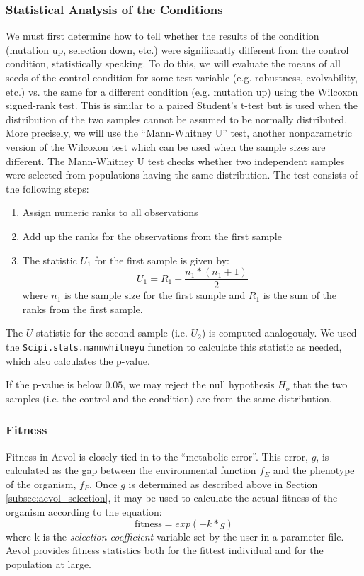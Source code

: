 \subsubsection{Statistical Analysis of the Conditions}
We must first determine how to tell whether the results of the condition (mutation up, selection down, etc.) were significantly different from the control condition, statistically speaking. To do this, we will evaluate the means of all seeds of the control condition for some test variable (e.g. robustness, evolvability, etc.) vs. the same for a different condition (e.g. mutation up) using the Wilcoxon signed-rank test. This is similar to a paired Student's t-test but is used when the distribution of the two samples cannot be assumed to be normally distributed. More precisely, we will use the ``Mann-Whitney U'' test, another nonparametric version of the Wilcoxon test which can be used when the sample sizes are different. The Mann-Whitney U test checks whether two independent samples were selected from populations having the same distribution. The test consists of the following steps:
\begin{enumerate}
	\item Assign numeric ranks to all observations
	\item Add up the ranks for the observations from the first sample
	\item The statistic $U_1$ for the first sample is given by:
	\begin{equation*}
	U_1 = R_1 - \frac{n_1*(n_1 + 1)}{2}
	\end{equation*}
	where $n_1$ is the sample size for the first sample and $R_1$ is the sum of the ranks from the first sample.
\end{enumerate}
The $U$ statistic for the second sample (i.e. $U_2$) is computed analogously. We used the \texttt{Scipi.stats.mannwhitneyu} function to calculate this statistic as needed, which also calculates the p-value. 

If the p-value is below $0.05$, we may reject the null hypothesis $H_o$ that the two samples (i.e. the control and the condition) are from the same distribution.

\subsubsection{Fitness}
Fitness in Aevol is closely tied in to the ``metabolic error''. This error, $g$, is calculated as the gap between the environmental function $f_E$ and the phenotype of the organism, $f_P$. Once $g$ is determined as described above in Section \ref{subsec:aevol_selection}, it may be used to calculate the actual fitness of the organism according to the equation:
\begin{equation*}
\text{fitness} = exp(-k*g)
\end{equation*} 
where k is the \textit{selection coefficient} variable set by the user in a parameter file. Aevol provides fitness statistics both for the fittest individual and for the population at large.
